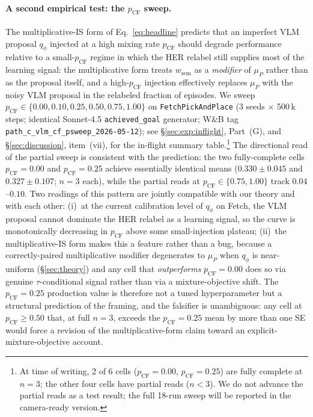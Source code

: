 \documentclass{article}
\begin{document}
\paragraph{A second empirical test: the $p_{\text{CF}}$ sweep.}
The multiplicative-IS form of Eq.~\eqref{eq:headline} predicts that an
imperfect VLM proposal $q_\phi$ injected at a high mixing rate
$p_{\text{CF}}$ should degrade performance relative to a small-$p_{\text{CF}}$
regime in which the HER relabel still supplies most of the learning
signal: the multiplicative form treats $w_{\text{sem}}$ as a
\emph{modifier} of $\mu_P$ rather than as the proposal itself, and a
high-$p_{\text{CF}}$ injection effectively replaces $\mu_P$ with the
noisy VLM proposal in the relabeled fraction of episodes. We sweep
$p_{\text{CF}}\!\in\!\{0.00, 0.10, 0.25, 0.50, 0.75, 1.00\}$ on
\texttt{FetchPickAndPlace} (3 seeds $\times$ 500\,k steps; identical
Sonnet-4.5 \texttt{achieved\_goal} generator; W\&B tag
\texttt{path\_c\_vlm\_cf\_psweep\_2026-05-12}); see
\S\ref{sec:exp:inflight}, Part~(G), and \S\ref{sec:discussion}, item~(vii),
for the in-flight summary table.\footnote{At time of writing, 2 of 6
cells ($p_{\text{CF}}\!=\!0.00$, $p_{\text{CF}}\!=\!0.25$) are
fully complete at $n\!=\!3$; the other four cells have partial reads
($n\!<\!3$). We do not advance the partial reads as a test result; the
full 18-run sweep will be reported in the camera-ready version.}
The directional read of the partial sweep is consistent with the
prediction: the two fully-complete cells $p_{\text{CF}}\!=\!0.00$ and
$p_{\text{CF}}\!=\!0.25$ achieve essentially identical means
($0.330\!\pm\!0.045$ and $0.327\!\pm\!0.107$; $n\!=\!3$ each), while
the partial reads at $p_{\text{CF}}\!\in\!\{0.75, 1.00\}$ track
$0.04$--$0.10$. Two readings of this pattern are jointly compatible
with our theory and with each other: (i)~at the current calibration
level of $q_\phi$ on Fetch, the VLM proposal cannot dominate the HER
relabel as a learning signal, so the curve is monotonically decreasing
in $p_{\text{CF}}$ above some small-injection plateau; (ii)~the
multiplicative-IS form makes this a feature rather than a bug, because
a correctly-paired multiplicative modifier degenerates to $\mu_P$ when
$q_\phi$ is near-uniform (\S\ref{sec:theory}) and any cell that
\emph{outperforms} $p_{\text{CF}}\!=\!0.00$ does so via genuine $\tau$-conditional
signal rather than via a mixture-objective shift. The $p_{\text{CF}}\!=\!0.25$
production value is therefore not a tuned hyperparameter but a structural
prediction of the framing, and the falsifier is unambiguous: any cell at
$p_{\text{CF}}\!\ge\!0.50$ that, at full $n\!=\!3$, exceeds the
$p_{\text{CF}}\!=\!0.25$ mean by more than one SE would force a revision
of the multiplicative-form claim toward an explicit-mixture-objective
account.
\end{document}
